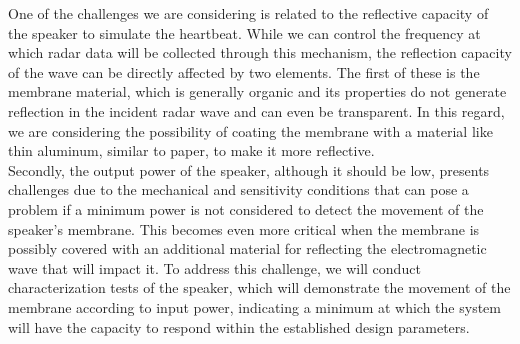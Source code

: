 \documentclass[lettersize,journal]{IEEEtran}
\begin{document}
One of the challenges we are considering is related to the reflective capacity of the speaker to simulate the heartbeat. While we can control the frequency at which radar data will be collected through this mechanism, the reflection capacity of the wave can be directly affected by two elements. The first of these is the membrane material, which is generally organic and its properties do not generate reflection in the incident radar wave and can even be transparent. In this regard, we are considering the possibility of coating the membrane with a material like thin aluminum, similar to paper, to make it more reflective. \\

Secondly, the output power of the speaker, although it should be low, presents challenges due to the mechanical and sensitivity conditions that can pose a problem if a minimum power is not considered to detect the movement of the speaker's membrane. This becomes even more critical when the membrane is possibly covered with an additional material for reflecting the electromagnetic wave that will impact it. To address this challenge, we will conduct characterization tests of the speaker, which will demonstrate the movement of the membrane according to input power, indicating a minimum at which the system will have the capacity to respond within the established design parameters.





% 








\end{document}
